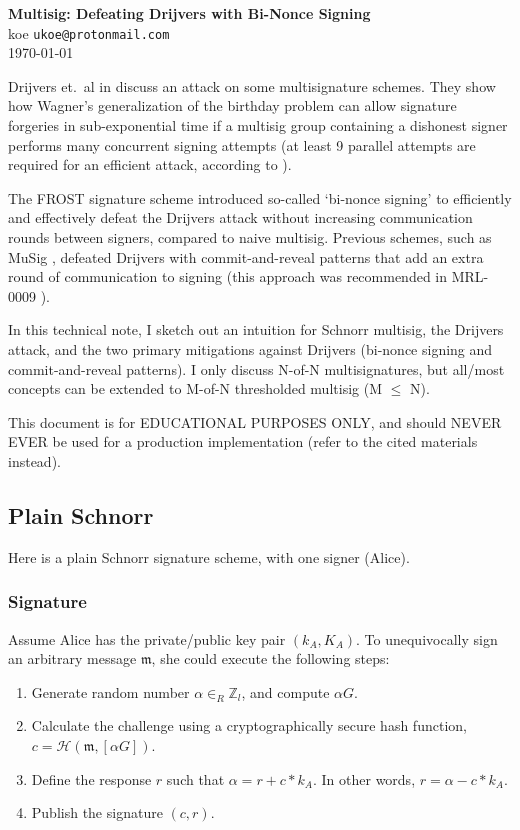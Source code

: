 \textbf{Multisig: Defeating Drijvers with Bi-Nonce Signing}\\
koe \texttt{ukoe@protonmail.com}\\
\today

Drijvers et.\ al in \cite{Drijvers-attack-multisig} discuss an attack on some multisignature schemes. They show how Wagner's generalization of the birthday problem \cite{generalized-birthday-wagner} can allow signature forgeries in sub-exponential time if a multisig group containing a dishonest signer performs many concurrent signing attempts (at least 9 parallel attempts are required for an efficient attack, according to \cite{ROS-attack-multisig}).

The FROST signature scheme \cite{FROST-multisig-scheme} introduced so-called `bi-nonce signing' to efficiently and effectively defeat the Drijvers attack without increasing communication rounds between signers, compared to naive multisig. Previous schemes, such as MuSig \cite{maxwell2018simple-musig}, defeated Drijvers with commit-and-reveal patterns that add an extra round of communication to signing (this approach was recommended in MRL-0009 \cite{MRL-0009-multisig}).

In this technical note, I sketch out an intuition for Schnorr multisig, the Drijvers attack, and the two primary mitigations against Drijvers (bi-nonce signing and commit-and-reveal patterns). I only discuss N-of-N multisignatures, but all/most concepts can be extended to M-of-N thresholded multisig (M $\leq$ N).

This document is for EDUCATIONAL PURPOSES ONLY, and should NEVER EVER be used for a production implementation (refer to the cited materials instead).


\subsection*{Plain Schnorr}

Here is a plain Schnorr signature scheme, with one signer (Alice).

\subsubsection*{Signature}

Assume Alice has the private/public key pair \((k_A, K_A)\). To unequivocally sign an arbitrary message $\mathfrak{m}$, she could execute the following steps:

\begin{enumerate}
	\item Generate random number $\alpha \in_R \mathbb{Z}_l$, and compute $\alpha G$.

	\item Calculate the challenge using a cryptographically secure hash function, \(c = \mathcal{H}(\mathfrak{m},[\alpha G])\).

	\item Define the response $r$ such that $\alpha = r + c*k_A$. In other words, $r = \alpha - c*k_A$.
	\item Publish the signature $(c, r)$.
\end{enumerate}

